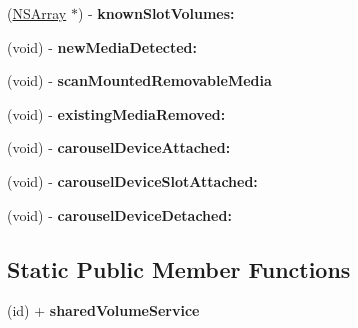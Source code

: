 \begin{DoxyCompactItemize}
\item 
\hypertarget{interface_d_a_c_volume_service_abdf538e24b7b81f329d2cd47aa90e29c}{
(\hyperlink{class_n_s_array}{NSArray} $\ast$) -\/ {\bfseries knownSlotVolumes:}}
\label{interface_d_a_c_volume_service_abdf538e24b7b81f329d2cd47aa90e29c}

\item 
\hypertarget{interface_d_a_c_volume_service_a11e8cb0380ac497a19c1c3e1340e5946}{
(void) -\/ {\bfseries newMediaDetected:}}
\label{interface_d_a_c_volume_service_a11e8cb0380ac497a19c1c3e1340e5946}

\item 
\hypertarget{interface_d_a_c_volume_service_a765a9026699b0900809c81bda9771e88}{
(void) -\/ {\bfseries scanMountedRemovableMedia}}
\label{interface_d_a_c_volume_service_a765a9026699b0900809c81bda9771e88}

\item 
\hypertarget{interface_d_a_c_volume_service_aa6ac353c2277e8206257d89b736816bf}{
(void) -\/ {\bfseries existingMediaRemoved:}}
\label{interface_d_a_c_volume_service_aa6ac353c2277e8206257d89b736816bf}

\item 
\hypertarget{interface_d_a_c_volume_service_a4c1867009e151291ba4d85adc7fbbac2}{
(void) -\/ {\bfseries carouselDeviceAttached:}}
\label{interface_d_a_c_volume_service_a4c1867009e151291ba4d85adc7fbbac2}

\item 
\hypertarget{interface_d_a_c_volume_service_a331005d8faa2cfcc5ed6b8a0b55e83f6}{
(void) -\/ {\bfseries carouselDeviceSlotAttached:}}
\label{interface_d_a_c_volume_service_a331005d8faa2cfcc5ed6b8a0b55e83f6}

\item 
\hypertarget{interface_d_a_c_volume_service_afdbc5d538b32920bd76ae3734ac6054a}{
(void) -\/ {\bfseries carouselDeviceDetached:}}
\label{interface_d_a_c_volume_service_afdbc5d538b32920bd76ae3734ac6054a}

\end{DoxyCompactItemize}
\subsection*{Static Public Member Functions}
\begin{DoxyCompactItemize}
\item 
\hypertarget{interface_d_a_c_volume_service_a9ecd3864ae4f45470d64c8d4dd7929ff}{
(id) + {\bfseries sharedVolumeService}}
\label{interface_d_a_c_volume_service_a9ecd3864ae4f45470d64c8d4dd7929ff}

\end{DoxyCompactItemize}
